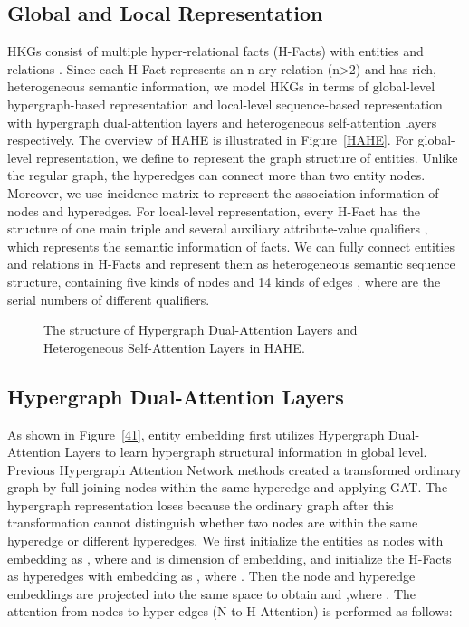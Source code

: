 \documentclass[11pt]{article}
\begin{document}
\subsection{Global and Local Representation}
HKGs  consist of multiple hyper-relational facts (H-Facts)  with entities  and relations . Since each H-Fact represents an n-ary relation (n>2) and has rich, heterogeneous semantic information, we model HKGs in terms of global-level hypergraph-based representation and local-level sequence-based representation with hypergraph dual-attention layers and heterogeneous self-attention layers respectively. The overview of HAHE is illustrated in Figure~\ref{HAHE}. For global-level representation, we define  to represent the graph structure of entities. Unlike the regular graph, the hyperedges can connect more than two entity nodes. Moreover, we use incidence matrix  to represent the association information of nodes and hyperedges. For local-level representation, every H-Fact has the structure of one main triple and several auxiliary attribute-value qualifiers , which represents the semantic information of facts. We can fully connect entities and relations in H-Facts and represent them as heterogeneous semantic sequence structure, containing five kinds of nodes  and 14 kinds of edges , where  are the serial numbers of different qualifiers. 
 
 \begin{figure*}[h!t]
	\centering    

    \hspace{7mm}
	
	\caption{The structure of Hypergraph Dual-Attention Layers and Heterogeneous Self-Attention Layers in HAHE.} \label{fig:1}  \end{figure*}
 





\subsection{Hypergraph Dual-Attention Layers}
As shown in Figure~\ref{41}, entity embedding first utilizes Hypergraph Dual-Attention Layers to learn hypergraph structural information in global level. Previous Hypergraph Attention Network methods created a transformed ordinary graph by full joining nodes within the same hyperedge and applying GAT. The hypergraph representation loses because the ordinary graph after this transformation cannot distinguish whether two nodes are within the same hyperedge or different hyperedges. We first initialize the entities as nodes with embedding as , where  and  is dimension of embedding, and initialize the H-Facts as hyperedges with embedding as , where . Then the node and hyperedge embeddings are projected into the same space to obtain  and  ,where . The attention from nodes to hyper-edges (N-to-H Attention) is performed as follows:
\end{document}
